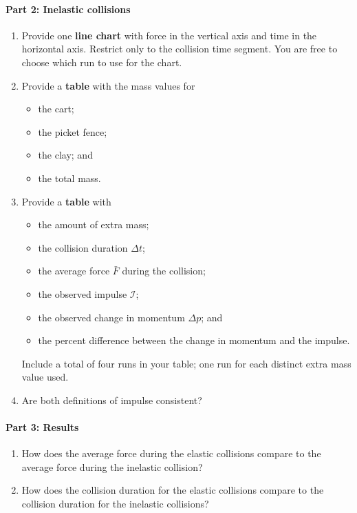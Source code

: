 \paragraph{Part 2: Inelastic collisions}
%
\begin{enumerate}
    \item Provide one \textbf{line chart} with force in the vertical axis and time in the horizontal axis. Restrict only to the collision time segment. You are free to choose which run to use for the chart.
    \item Provide a \textbf{table} with the mass values for
    \begin{itemize}
        \item the cart;
        \item the picket fence;
        \item the clay; and
        \item the total mass.
    \end{itemize}
    \newpage
    \item Provide a \textbf{table} with
    \begin{itemize}
        \item the amount of extra mass;
        \item the collision duration $\Delta t$;
        \item the average force $\bar{F}$ during the collision;
        \item the observed impulse $\mathcal{I}$;
        \item the observed change in momentum $\Delta p$; and
        \item the percent difference between the change in momentum and the impulse.
    \end{itemize}
    Include a total of four runs in your table; one run for each distinct extra mass value used.
    \item Are both definitions of impulse consistent?
\end{enumerate}
%
\paragraph{Part 3: Results}
%
\begin{enumerate}
    \item How does the average force during the elastic collisions compare to the average force during the inelastic collision?
    \item How does the collision duration for the elastic collisions compare to the collision duration for the inelastic collisions?
\end{enumerate}
%
\newpage
